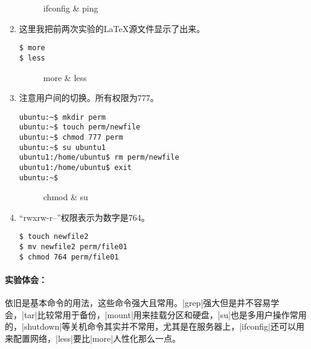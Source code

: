 \documentclass[cs4size,a4paper,nofonts]{ctexart}
\begin{document}
\begin{enumerate}
\begin{figure}[htp]
\caption{\label{fig:ifconfig}ifconfig \& ping}
\end{figure}

\item 这里我把前两次实验的\LaTeX 源文件显示了出来。
\begin{Verbatim}
$ more
$ less
\end{Verbatim}

\begin{figure}[htp]

\caption{\label{fig:more}more \& less}
\end{figure}

\item 注意用户间的切换。所有权限为777。
\begin{Verbatim}
ubuntu:~$ mkdir perm
ubuntu:~$ touch perm/newfile
ubuntu:~$ chmod 777 perm
ubuntu:~$ su ubuntu1
ubuntu1:/home/ubuntu$ rm perm/newfile
ubuntu1:/home/ubuntu$ exit
ubuntu:~$ 
\end{Verbatim}

\begin{figure}[htp]
\caption{\label{fig:chmod1}chmod \& su}
\end{figure}

\item “rwxrw-r–”权限表示为数字是764。
\begin{Verbatim}
$ touch newfile2
$ mv newfile2 perm/file01
$ chmod 764 perm/file01
\end{Verbatim}

\begin{figure}[htp]
\end{figure}

\end{enumerate}

\paragraph{实验体会：}\quad

依旧是基本命令的用法，这些命令强大且常用。|grep|强大但是并不容易学会，|tar|比较常用于备份，|mount|用来挂载分区和硬盘，|su|也是多用户操作常用的，|shutdown|等关机命令其实并不常用，尤其是在服务器上，|ifconfig|还可以用来配置网络，|less|要比|more|人性化那么一点。
\end{document}
